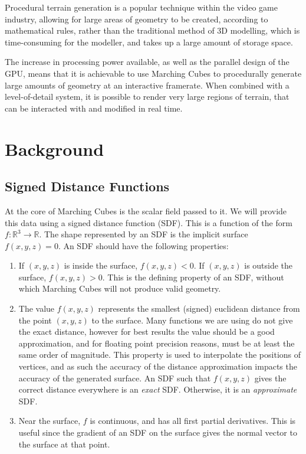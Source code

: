 \documentclass[11pt]{article}
\begin{document}
Procedural terrain generation is a popular technique within the video game industry, allowing for large areas of geometry to be created, according to mathematical rules, rather than the traditional method of 3D modelling, which is time-consuming for the modeller, and takes up a large amount of storage space.

The increase in processing power available, as well as the parallel design of the GPU, means that it is achievable to use Marching Cubes to procedurally generate large amounts of geometry at an interactive framerate. When combined with a level-of-detail system, it is possible to render very large regions of terrain, that can be interacted with and modified in real time.

\section{Background}
\subsection{Signed Distance Functions} 
\label{section:sdf}
At the core of Marching Cubes is the scalar field passed to it. We will provide this data using a signed distance function (SDF). This is a function of the form $f:\mathbb{R}^3 \rightarrow \mathbb{R}$. The shape represented by an SDF is the implicit surface $f\left(x,y,z\right) = 0$. An SDF should have the following properties:
\begin{enumerate}[label=\roman*.]
\item If $\left(x,y,z\right)$ is inside the surface, $f\left(x,y,z\right) < 0$. If $\left(x,y,z\right)$ is outside the surface, $f\left(x,y,z\right) > 0$. This is the defining property of an SDF, without which Marching Cubes will not produce valid geometry.
\item The value $f\left(x,y,z\right)$ represents the smallest (signed) euclidean distance from the point $\left(x,y,z\right)$ to the surface. Many functions we are using do not give the exact distance, however for best results the value should be a good approximation, and for floating point precision reasons, must be at least the same order of magnitude. This property is used to interpolate the positions of vertices, and as such the accuracy of the distance approximation impacts the accuracy of the generated surface. An SDF such that $f\left(x,y,z\right)$ gives the correct distance everywhere is an \textit{exact} SDF. Otherwise, it is an \textit{approximate} SDF.
\item Near the surface, $f$ is continuous, and has all first partial derivatives. This is useful since the gradient of an SDF on the surface gives the normal vector to the surface at that point.
\end{enumerate}
\end{document}
